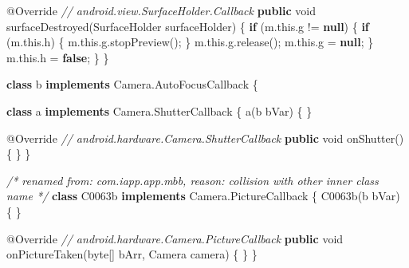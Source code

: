 \documentclass[
]{article}
\newenvironment{Shaded}{}{}
\newcommand{\AttributeTok}[1]{\textcolor[rgb]{0.49,0.56,0.16}{#1}}
\newcommand{\CommentTok}[1]{\textcolor[rgb]{0.38,0.63,0.69}{\textit{#1}}}
\newcommand{\ControlFlowTok}[1]{\textcolor[rgb]{0.00,0.44,0.13}{\textbf{#1}}}
\newcommand{\DataTypeTok}[1]{\textcolor[rgb]{0.56,0.13,0.00}{#1}}
\newcommand{\FunctionTok}[1]{\textcolor[rgb]{0.02,0.16,0.49}{#1}}
\newcommand{\KeywordTok}[1]{\textcolor[rgb]{0.00,0.44,0.13}{\textbf{#1}}}
\newcommand{\NormalTok}[1]{#1}
\newcommand{\OperatorTok}[1]{\textcolor[rgb]{0.40,0.40,0.40}{#1}}
\begin{document}
\begin{Shaded}
\begin{Highlighting}[]
        \AttributeTok{@Override} \CommentTok{// android.view.SurfaceHolder.Callback}
        \KeywordTok{public} \DataTypeTok{void} \FunctionTok{surfaceDestroyed}\OperatorTok{(}\NormalTok{SurfaceHolder surfaceHolder}\OperatorTok{)} \OperatorTok{\{}
            \ControlFlowTok{if} \OperatorTok{(}\NormalTok{m}\OperatorTok{.}\FunctionTok{this}\OperatorTok{.}\FunctionTok{g} \OperatorTok{!=} \KeywordTok{null}\OperatorTok{)} \OperatorTok{\{}
                \ControlFlowTok{if} \OperatorTok{(}\NormalTok{m}\OperatorTok{.}\FunctionTok{this}\OperatorTok{.}\FunctionTok{h}\OperatorTok{)} \OperatorTok{\{}
\NormalTok{                    m}\OperatorTok{.}\FunctionTok{this}\OperatorTok{.}\FunctionTok{g}\OperatorTok{.}\FunctionTok{stopPreview}\OperatorTok{();}
                \OperatorTok{\}}
\NormalTok{                m}\OperatorTok{.}\FunctionTok{this}\OperatorTok{.}\FunctionTok{g}\OperatorTok{.}\FunctionTok{release}\OperatorTok{();}
\NormalTok{                m}\OperatorTok{.}\FunctionTok{this}\OperatorTok{.}\FunctionTok{g} \OperatorTok{=} \KeywordTok{null}\OperatorTok{;}
            \OperatorTok{\}}
\NormalTok{            m}\OperatorTok{.}\FunctionTok{this}\OperatorTok{.}\FunctionTok{h} \OperatorTok{=} \KeywordTok{false}\OperatorTok{;}
        \OperatorTok{\}}
    \OperatorTok{\}}

    \KeywordTok{class}\NormalTok{ b }\KeywordTok{implements}\NormalTok{ Camera}\OperatorTok{.}\FunctionTok{AutoFocusCallback} \OperatorTok{\{}

        \KeywordTok{class}\NormalTok{ a }\KeywordTok{implements}\NormalTok{ Camera}\OperatorTok{.}\FunctionTok{ShutterCallback} \OperatorTok{\{}
            \FunctionTok{a}\OperatorTok{(}\NormalTok{b bVar}\OperatorTok{)} \OperatorTok{\{}
            \OperatorTok{\}}

            \AttributeTok{@Override} \CommentTok{// android.hardware.Camera.ShutterCallback}
            \KeywordTok{public} \DataTypeTok{void} \FunctionTok{onShutter}\OperatorTok{()} \OperatorTok{\{}
            \OperatorTok{\}}
        \OperatorTok{\}}

        \CommentTok{/* renamed from: com.iapp.app.m$b$b, reason: collision with other inner class name */}
        \KeywordTok{class}\NormalTok{ C0063b }\KeywordTok{implements}\NormalTok{ Camera}\OperatorTok{.}\FunctionTok{PictureCallback} \OperatorTok{\{}
            \FunctionTok{C0063b}\OperatorTok{(}\NormalTok{b bVar}\OperatorTok{)} \OperatorTok{\{}
            \OperatorTok{\}}

            \AttributeTok{@Override} \CommentTok{// android.hardware.Camera.PictureCallback}
            \KeywordTok{public} \DataTypeTok{void} \FunctionTok{onPictureTaken}\OperatorTok{(}\DataTypeTok{byte}\OperatorTok{[]}\NormalTok{ bArr}\OperatorTok{,}\NormalTok{ Camera camera}\OperatorTok{)} \OperatorTok{\{}
            \OperatorTok{\}}
        \OperatorTok{\}}


\end{Highlighting}
\end{Shaded}
\end{document}

